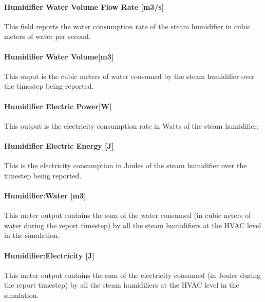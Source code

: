 \paragraph{Humidifier Water Volume Flow Rate {[}m3/s{]}}\label{humidifier-water-volume-flow-rate-m3s}

This field reports the water consumption rate of the steam humidifier in cubic meters of water per second.

\paragraph{Humidifier Water Volume{[}m3{]}}\label{humidifier-water-volumem3}

This ouput is the cubic meters of water consumed by the steam humidifier over the timestep being reported.

\paragraph{Humidifier Electric Power{[}W{]}}\label{humidifier-electric-powerw}

This output is the electricity consumption rate in Watts of the steam humidifier.

\paragraph{Humidifier Electric Energy {[}J{]}}\label{humidifier-electric-energy-j}

This is the electricity consumption in Joules of the steam humidifier over the timestep being reported.

\paragraph{Humidifier:Water {[}m3{]}}\label{humidifierwater-m3}

This meter output contains the sum of the water consumed (in cubic neters of water during the report timestep) by all the steam humidifiers at the HVAC level in the simulation.

\paragraph{Humidifier:Electricity {[}J{]}}\label{humidifierelectricity-j}

This meter output contains the sum of the electricity consumed (in Joules during the report timestep) by all the steam humidifiers at the HVAC level in the simulation.

